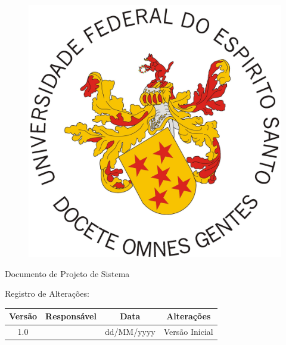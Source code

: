 \documentclass[
	12pt,				
	oneside,		
	a4paper,			
	english,			%
	french,				%
	spanish,			%
	brazil				%
	]{abntex2}
\newcommand{\subtitulo}{Documento de Projeto de Sistema}
\renewcommand{\imprimircapa}{%
	\begin{capa}%
		\center
		
		{\ABNTEXchapterfont\large\subtitulo{}}
		\vfill
		\begin{center}
			\ABNTEXchapterfont\bfseries\LARGE\imprimirtitulo
		\end{center}
		
		\vfill
		Registro de Altera{\c c}{\~ o}es:
		\begin{table}[h]
			\centering
			\vspace{0.5cm}
			\begin{tabular}{|c|c|c|c|} \hline
			
 				Versão & Responsável & Data  & Alterações \\ \hline   
 				                            
				1.0  & \imprimirautor & dd/MM/yyyy & Versão Inicial  \\ \hline 
			\end{tabular}
		\end{table}
		
		\vfill
		\large\imprimirlocal
		\linebreak
		\large\imprimirdata
		\vspace*{1cm}
	\end{capa}
}
\begin{document}
\frenchspacing

\begin{figure}[h]
  \centering
  \includegraphics[scale=0.055]{brasao.jpg}
  \label{ppts3}
\end{figure} 

\imprimircapa





\textual

\begingroup
\let\clearpage\relax

\vspace*{2cm}
\endgroup







\postextual



\printindex

\end{document}
